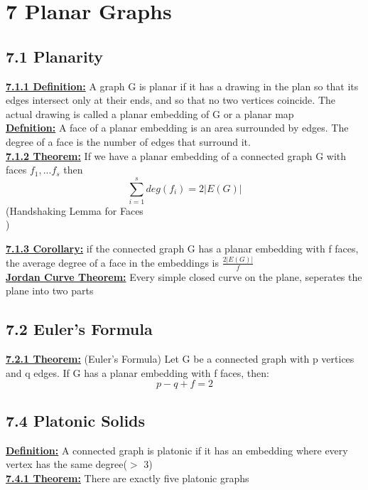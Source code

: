\documentclass[12pt]{article}
\newcommand{\myt}[1]{\textbf{\underline{#1}}}
\begin{document}
	\section*{7 Planar Graphs}
	\subsection*{7.1 Planarity}
	\myt{7.1.1 Definition:} A graph G is planar if it has a drawing in the plan so that its edges intersect only at their ends, and so that no two vertices coincide. The actual drawing is called a planar embedding of G or a planar map\\
	
	\myt{Defnition:} A face of a planar embedding is an area surrounded by edges. The degree of a face is the number of edges that surround it.\\
	
	\myt{7.1.2 Theorem:} If we have a planar embedding of a connected graph G with faces $f_1, ...f_s$ then\\
	$$\sum_{i=1}^{s}deg(f_i) = 2|E(G)|$$
	(Handshaking Lemma for Faces\\)
	
	\myt{7.1.3 Corollary:} if the connected graph G has a planar embedding with f faces, the average degree of a face in the embeddings is $\frac{2|E(G)|}{f}$\\
	
	\myt{Jordan Curve Theorem:} Every simple closed curve on the plane, seperates the plane into two parts\\
	
	\subsection*{7.2 Euler's Formula}
	\myt{7.2.1 Theorem:} (Euler's Formula) Let G be a connected graph with p vertices and q edges. If G has a planar embedding with f faces, then:\\
	$$p - q + f = 2$$
	
	\subsection*{7.4 Platonic Solids}
	\myt{Definition:} A connected graph is platonic if it has an embedding where every vertex has the same degree($>$ 3)\\
	
	\myt{7.4.1 Theorem:} There are exactly five platonic graphs\\
	
\end{document}
